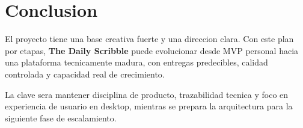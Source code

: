 \documentclass[12pt,a4paper]{article}
\begin{document}
\section{Conclusion}
El proyecto tiene una base creativa fuerte y una direccion clara. Con este plan por etapas, \textbf{The Daily Scribble} puede evolucionar desde MVP personal hacia una plataforma tecnicamente madura, con entregas predecibles, calidad controlada y capacidad real de crecimiento.

La clave sera mantener disciplina de producto, trazabilidad tecnica y foco en experiencia de usuario en desktop, mientras se prepara la arquitectura para la siguiente fase de escalamiento.
\end{document}
